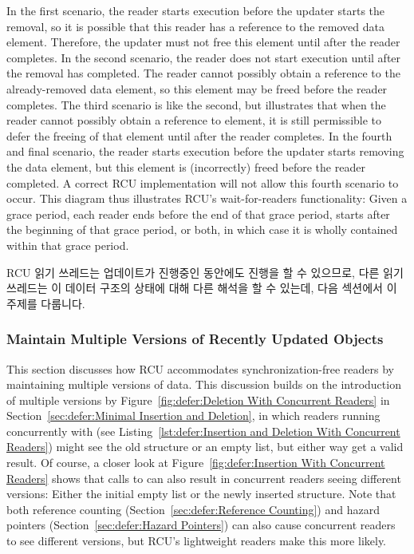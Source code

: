 In the first scenario, the reader starts execution before the
updater starts the removal, so it is possible that this reader
has a reference to the removed data element.
Therefore, the updater must not free this element until after the
reader completes.
In the second scenario, the reader does not start execution until
after the removal has completed.
The reader cannot possibly obtain a reference to the already-removed
data element, so this element may be freed before the reader completes.
The third scenario is like the second, but illustrates that when the
reader cannot possibly obtain a reference to element, it is still
permissible to defer the freeing of that element until after the
reader completes.
In the fourth and final scenario, the reader starts execution before
the updater starts removing the data element, but this element
is (incorrectly) freed before the reader completed.
A correct RCU implementation will not allow this fourth scenario to
occur.
This diagram thus illustrates RCU's wait-for-readers functionality:
Given a grace period, each reader ends before the end of that grace
period, starts after the beginning of that grace period, or both, in
which case it is wholly contained within that grace period.

\fi

RCU 읽기 쓰레드는 업데이트가 진행중인 동안에도 진행을 할 수 있으므로, 다른 읽기
쓰레드는 이 데이터 구조의 상태에 대해 다른 해석을 할 수 있는데, 다음 섹션에서
이 주제를 다룹니다.

\subsubsection{Maintain Multiple Versions of Recently Updated Objects}
\label{sec:defer:Maintain Multiple Versions of Recently Updated Objects}

This section discusses how RCU accommodates synchronization-free readers
by maintaining multiple versions of data.
This discussion builds on the introduction of multiple versions by
Figure~\ref{fig:defer:Deletion With Concurrent Readers}
in
Section~\ref{sec:defer:Minimal Insertion and Deletion},
in which readers running concurrently with 
(see Listing~\ref{lst:defer:Insertion and Deletion With Concurrent Readers})
might see the old  structure or an empty list, but either
way get a valid result.
Of course, a closer look at
Figure~\ref{fig:defer:Insertion With Concurrent Readers}
shows that calls to  can also result in concurrent
readers seeing different versions: Either the initial empty list
or the newly inserted  structure.
Note that both reference counting
(Section~\ref{sec:defer:Reference Counting})
and hazard pointers
(Section~\ref{sec:defer:Hazard Pointers})
can also cause concurrent readers to see different versions, but
RCU's lightweight readers make this more likely.


